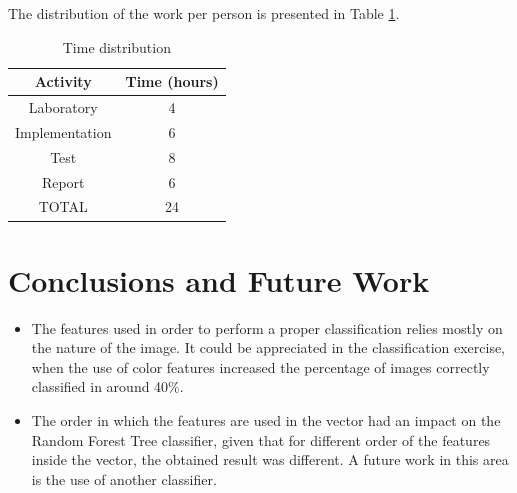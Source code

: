 \documentclass{IEEEtran}
\begin{document}
The distribution of the work per person is presented in Table \ref{table:time}.

\begin{table}[h!]
\centering
  \begin{tabular}{ | c | c | }
    \hline
    Activity & Time (hours)  \\ \hline
    Laboratory & 4\\ \hline
    Implementation & 6 \\ \hline
    Test & 8 \\ \hline
    Report & 6 \\ \hline
    TOTAL & 24 \\ \hline
  \end{tabular}
  \caption{Time distribution}
  \label{table:time}
\end{table}

\section{Conclusions and Future Work}

\begin{itemize}
 \item The features used in order to perform a proper classification relies mostly on the nature of the image. It could be appreciated in the classification exercise, when the use of color features increased the percentage of images correctly classified in around 40\%. 
 \item The order in which the features are used in the vector had an impact on the Random Forest Tree classifier, given that for different order of the features inside the vector, the obtained result was different. A future work in this area is the use of another classifier.
\end{itemize}




\newpage
\onecolumn
\appendix

\end{document}
